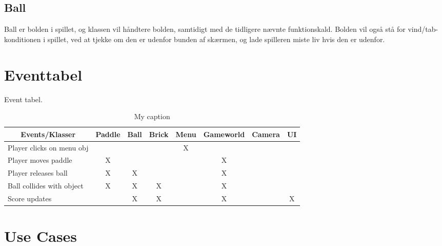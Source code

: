 \subsection{Ball}
Ball er bolden i spillet, og klassen vil håndtere bolden, samtidigt med de tidligere nævnte funktionskald. Bolden vil også stå for
vind/tab-konditionen i spillet, ved at tjekke om den er udenfor bunden af skærmen, og lade spilleren miste liv hvis den er udenfor.


\section{Eventtabel}
Event tabel.
\begin{table}[]
\centering
\caption{My caption}
\label{my-label}
\begin{tabular}{l|ccccccc}
\multicolumn{1}{c}{Events/Klasser} & Paddle & Ball & Brick & Menu & Gameworld & Camera & UI \\ \hline
Player clicks on menu obj &                            &                          &                           & X                        &                               &                            &                        \\
Player moves paddle          & X                          &                          &                           &                          & X                             &                            &                        \\
Player releases ball         & X                          & X                        &                           &                          & X                             &                            &                        \\
Ball collides with object    & X                          & X                        & X                         &                          & X                             &                            &                        \\
Score updates                &                            & X                        & X                         &                          & X                             &                            & X                     
\end{tabular}
\end{table}

\section{Use Cases}

